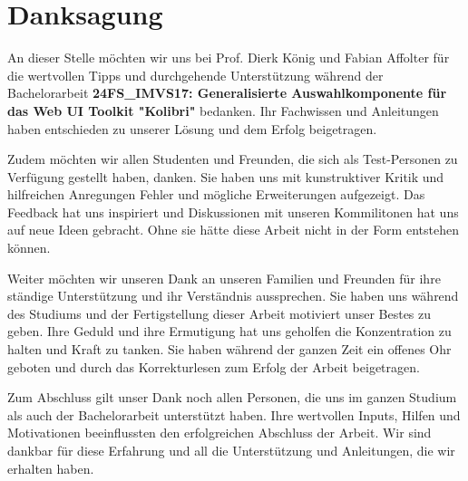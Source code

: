 \chapter*{Danksagung}

An dieser Stelle möchten wir uns bei Prof. Dierk König und Fabian Affolter für die wertvollen Tipps und durchgehende Unterstützung 
während der Bachelorarbeit \textbf{24FS\_IMVS17: Generalisierte Auswahlkomponente für das Web UI Toolkit "Kolibri"} bedanken. 
Ihr Fachwissen und Anleitungen haben entschieden zu unserer Lösung und dem Erfolg beigetragen.

Zudem möchten wir allen Studenten und Freunden, die sich als Test-Personen zu Verfügung gestellt haben, danken.
Sie haben uns mit kunstruktiver Kritik und hilfreichen Anregungen Fehler und mögliche Erweiterungen aufgezeigt. 
Das Feedback hat uns inspiriert und Diskussionen mit unseren Kommilitonen hat uns auf neue Ideen gebracht.
Ohne sie hätte diese Arbeit nicht in der Form entstehen können.

Weiter möchten wir unseren Dank an unseren Familien und Freunden für ihre ständige Unterstützung und ihr Verständnis aussprechen.
Sie haben uns während des Studiums und der Fertigstellung dieser Arbeit motiviert unser Bestes zu geben. 
Ihre Geduld und ihre Ermutigung hat uns geholfen die Konzentration zu halten und Kraft zu tanken.
Sie haben während der ganzen Zeit ein offenes Ohr geboten und durch das Korrekturlesen zum Erfolg der Arbeit beigetragen.

Zum Abschluss gilt unser Dank noch allen Personen, die uns im ganzen Studium als auch der Bachelorarbeit unterstützt haben.
Ihre wertvollen Inputs, Hilfen und Motivationen beeinflussten den erfolgreichen Abschluss der Arbeit.
Wir sind dankbar für diese Erfahrung und all die Unterstützung und Anleitungen, die wir erhalten haben.

